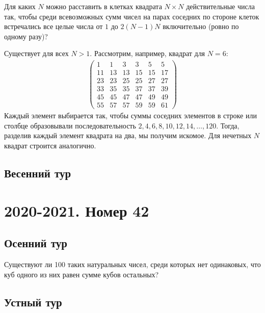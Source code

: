 \documentclass[11pt, a4paper]{common/document_template}
\begin{document}
\begin{exercise}
Для каких $N$ можно расставить в клетках квадрата $N \times N$ действительные числа так, чтобы среди всевозможных сумм чисел на парах соседних по стороне клеток встречались все целые числа от $1$ до $2(N-1)N$ включительно (ровно по одному разу)?
\end{exercise}

\begin{Solution}
Существует для всех $N > 1$. Рассмотрим, например, квадрат для $N = 6$:
\begin{align*}
\begin{pmatrix}
1  &  1 & 3  &  3 & 5  & 5  \\
11 & 13 & 13 & 15 & 15 & 17 \\
23 & 23 & 25 & 25 & 27 & 27 \\
33 & 35 & 35 & 37 & 37 & 39 \\
45 & 45 & 47 & 47 & 49 & 49 \\
55 & 57 & 57 & 59 & 59 & 61
\end{pmatrix}
\end{align*}
Каждый элемент выбирается так, чтобы суммы соседних элементов в строке или столбце образовывали последовательность $2, 4, 6, 8, 10, 12, 14, \dots, 120$. Тогда, разделив каждый элемент квадрата на два, мы получим искомое. Для нечетных $N$ квадрат строится аналогично.
\end{Solution}

\section{Весенний тур}

\chapter{2020-2021. Номер 42}

\section{Осенний тур}

\begin{exercise}
Существуют ли 100 таких натуральных чисел, среди которых нет одинаковых, что куб одного из них равен сумме кубов остальных?
\end{exercise}

\section{Устный тур}
\end{document}
